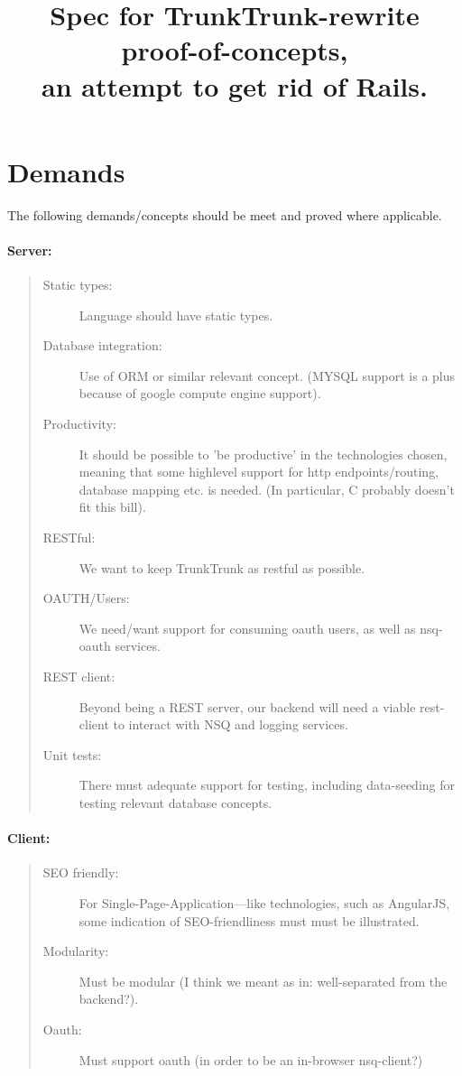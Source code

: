 \documentclass[a4paper, titlepage]{article}
\begin{document}
\title{
	Spec for TrunkTrunk-rewrite proof-of-concepts,\\
	an attempt to get rid of Rails.
}
\maketitle

\section{Demands}
The following demands/concepts should be meet and proved where applicable.

\paragraph*{Server:}
\begin{quote} %
\begin{description}
\item [Static types:] Language should have static types.
\item [Database integration:] Use of ORM or similar relevant concept. (MYSQL support is a plus because of google compute
	engine support).
\item [Productivity:] It should be possible to 'be productive' in the
	technologies chosen, meaning that some highlevel support for http
	endpoints/routing, database mapping etc. is needed. (In particular, C
	probably doesn't fit this bill).
\item [RESTful:] We want to keep TrunkTrunk as restful as possible.
\item [OAUTH/Users:] We need/want support for consuming oauth users, as well as
	nsq-oauth services.
\item [REST client:] Beyond being a REST server, our backend will need a
	viable rest-client to interact with NSQ and logging services.
\item [Unit tests:] There must adequate support for testing, including
	data-seeding for testing relevant database concepts.
\end{description}
\end{quote}

\paragraph*{Client:}
\begin{quote} %
\begin{description}
\item [SEO friendly:] For Single-Page-Application---like technologies, such as
	AngularJS, some indication of SEO-friendliness must must be illustrated.
\item [Modularity:] Must be modular (I think we meant as in: well-separated from
	the backend?).
\item [Oauth:] Must support oauth (in order to be an in-browser nsq-client?)
\end{description}
\end{quote}
\end{document}
